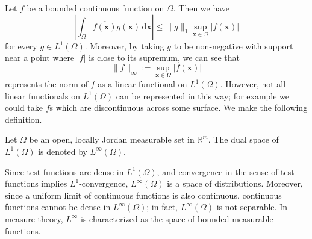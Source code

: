 \begin{Example}
\label{ex:bounded-continuous-lp-one-dual}
Let $f$ be a bounded continuous function on $\Omega$. Then we have
\begin{equation}\label{eq:bounded-continuous-lp-one-dual-estimate}
\left|\int_\Omega\overline{f(\bm{x})}g(\bm{x})\,\mathrm{d}\bm{x}\right|\leq\|g\|_1\sup_{\bm{x}\in\Omega}|f(\bm{x})|
\end{equation}
for every $g\in L^1(\Omega)$. Moreover, by taking $g$ to be non-negative with support near a point where $|f|$ is close to its supremum, we can see that
\begin{equation}\label{eq:bounded-continuous-infinity-norm}
\|f\|_\infty:=\sup_{\bm{x}\in\Omega}|f(\bm{x})|
\end{equation}
represents the norm of $f$ as a linear functional on $L^1(\Omega)$. However, not all linear functionals on $L^1(\Omega)$ can be represented in this way; for example we could take $f$\textquotesingle s which are discontinuous across some surface. We make the following definition.
\end{Example}

\begin{Definition}
\label{def:lp-infinity-dual-space}
Let $\Omega$ be an open, locally Jordan measurable set in $\mathbb{R}^m$. The dual space of $L^1(\Omega)$ is denoted by $L^\infty(\Omega)$.
\end{Definition}

Since test functions are dense in $L^1(\Omega)$, and convergence in the sense of test functions implies $L^1$-convergence, $L^\infty(\Omega)$ is a space of distributions. Moreover, since a uniform limit of continuous functions is also continuous, continuous functions cannot be dense in $L^\infty(\Omega)$; in fact, $L^\infty(\Omega)$ is not separable. In measure theory, $L^\infty$ is characterized as the space of bounded measurable functions.
